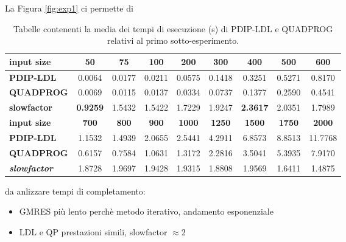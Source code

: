 \begin{figure}[!h]
    \centering
    
\end{figure}

La Figura \ref{fig:exp1} ci permette di 

\begin{table}[!h]
\centering
\begin{tabular}{|l|c|c|c|c|c|c|c|c|}
\hline \textbf{input size}                  & \textbf{50}  & \textbf{75}  & \textbf{100} & \textbf{200}  & \textbf{300}  & \textbf{400}  & \textbf{500}  & \textbf{600}  \\\hline
\textbf{PDIP-LDL}                    & 0.0064       & 0.0177       & 0.0211       & 0.0575        & 0.1418        & 0.3251        & 0.5271        & 0.8170        \\
\textbf{QUADPROG}                    & 0.0069       & 0.0115       & 0.0137       & 0.0334        & 0.0737        & 0.1377        & 0.2590        & 0.4541        \\
\textbf{slowfactor} & \textbf{0.9259}       & 1.5432       & 1.5422       & 1.7229        & 1.9247        & \textbf{2.3617}        & 2.0351        & 1.7989        \\ \hline
\textbf{input size}                  & \textbf{700} & \textbf{800} & \textbf{900} & \textbf{1000} & \textbf{1250} & \textbf{1500} & \textbf{1750} & \textbf{2000} \\\hline
\textbf{PDIP-LDL}                    & 1.1532       & 1.4939       & 2.0655       & 2.5441        & 4.2911        & 6.8573        & 8.8513        & 11.7768       \\
\textbf{QUADPROG}                    & 0.6157       & 0.7584       & 1.0631       & 1.3172        & 2.2816        & 3.5041        & 5.3935        & 7.9170        \\
\textbf{\textit{slowfactor}} & 1.8728       & 1.9697       & 1.9428       & 1.9315        & 1.8808        & 1.9569        & 1.6411        & 1.4875  \\\hline     
\end{tabular}
    \caption{Tabelle contenenti la media dei tempi di esecuzione (s) di PDIP-LDL e QUADPROG relativi al primo sotto-esperimento. \label{tab:ldlqp2}}
    \end{table}
   
da anlizzare tempi di completamento:
\begin{itemize}
    \item GMRES più lento perchè metodo iterativo, andamento esponenziale
    \item LDL e QP prestazioni simili, slowfactor $\approx 2$
\end{itemize}
    
